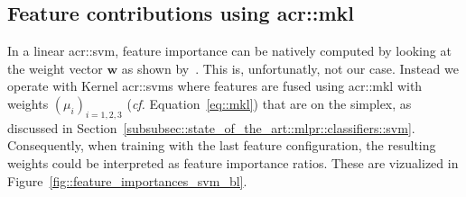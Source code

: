     \subsection{Feature contributions using \acrshort*{acr::mkl}}
        \label{subsec::more_experiments::classifier::feature_importance}
        In a linear \gls{acr::svm}, feature importance can be natively computed by looking at the weight vector \(\bm{w}\) as shown by~\textcite{guyon2002gene}.
        This is, unfortunatly, not our case.
        Instead we operate with Kernel \glspl{acr::svm} where features are fused using \gls{acr::mkl} with weights \(\left(\mu_i\right)_{i=1, 2, 3}\) (\textit{cf.} Equation~\ref{eq::mkl}) that are on the simplex, as discussed in Section~\ref{subsubsec::state_of_the_art::mlpr::classifiers::svm}.
        Consequently, when training with the last feature configuration, the resulting weights could be interpreted as feature importance ratios.
        These are vizualized in Figure~\ref{fig::feature_importances_svm_bl}.\\

        \begin{figure}[htpb]
            \centering
        \end{figure}

